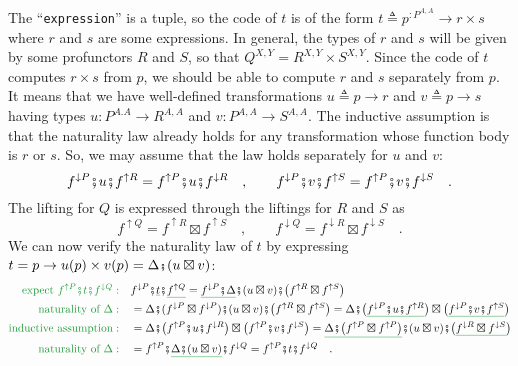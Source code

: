 The ``\lstinline!expression!'' is a tuple, so the code of $t$
is of the form $t\triangleq p^{:P^{A,A}}\rightarrow r\times s$ where
$r$ and $s$ are some expressions. In general, the types of $r$
and $s$ will be given by some profunctors $R$ and $S$, so that
$Q^{X,Y}=R^{X,Y}\times S^{X,Y}$. Since the code of $t$ computes
$r\times s$ from $p$, we should be able to compute $r$ and $s$
separately from $p$. It means that we have well-defined transformations
$u\triangleq p\rightarrow r$ and $v\triangleq p\rightarrow s$ having
types $u:P^{A.A}\rightarrow R^{A,A}$ and $v:P^{A,A}\rightarrow S^{A,A}$.
The inductive assumption is that the naturality law already holds
for any transformation whose function body is $r$ or $s$. So, we
may assume that the law holds separately for $u$ and $v$:
\[
f^{\downarrow P}\bef u\bef f^{\uparrow R}=f^{\uparrow P}\bef u\bef f^{\downarrow R}\quad,\quad\quad f^{\downarrow P}\bef v\bef f^{\uparrow S}=f^{\uparrow P}\bef v\bef f^{\downarrow S}\quad.
\]
The lifting for $Q$ is expressed through the liftings for $R$ and
$S$ as
\[
f^{\uparrow Q}=f^{\uparrow R}\boxtimes f^{\uparrow S}\quad,\quad\quad f^{\downarrow Q}=f^{\downarrow R}\boxtimes f^{\downarrow S}\quad.
\]
We can now verify the naturality law of $t$ by expressing $t=p\rightarrow u(p)\times v(p)=\Delta\bef(u\boxtimes v)$:
\begin{align*}
{\color{greenunder}\text{expect }f^{\uparrow P}\bef t\bef f^{\downarrow Q}:}\quad & f^{\downarrow P}\bef\gunderline t\bef\gunderline{f^{\uparrow Q}}=\gunderline{f^{\downarrow P}\bef\Delta}\bef(u\boxtimes v)\bef\big(f^{\uparrow R}\boxtimes f^{\uparrow S}\big)\\
{\color{greenunder}\text{naturality of }\Delta:}\quad & =\Delta\bef(f^{\downarrow P}\boxtimes f^{\downarrow P})\bef(u\boxtimes v)\bef\big(f^{\uparrow R}\boxtimes f^{\uparrow S}\big)=\Delta\bef\big(\gunderline{f^{\downarrow P}\bef u\bef f^{\uparrow R}}\big)\boxtimes\big(\gunderline{f^{\downarrow P}\bef v\bef f^{\uparrow S}}\big)\\
{\color{greenunder}\text{inductive assumption}:}\quad & =\Delta\bef\big(f^{\uparrow P}\bef u\bef f^{\downarrow R}\big)\boxtimes\big(f^{\uparrow P}\bef v\bef f^{\downarrow S}\big)=\gunderline{\Delta\bef\big(f^{\uparrow P}\boxtimes f^{\uparrow P}\big)}\bef(u\boxtimes v)\bef\big(\gunderline{f^{\downarrow R}\boxtimes f^{\downarrow S}}\big)\\
{\color{greenunder}\text{naturality of }\Delta:}\quad & =f^{\uparrow P}\bef\gunderline{\Delta\bef(u\boxtimes v)}\bef f^{\downarrow Q}=f^{\uparrow P}\bef t\bef f^{\downarrow Q}\quad.
\end{align*}


